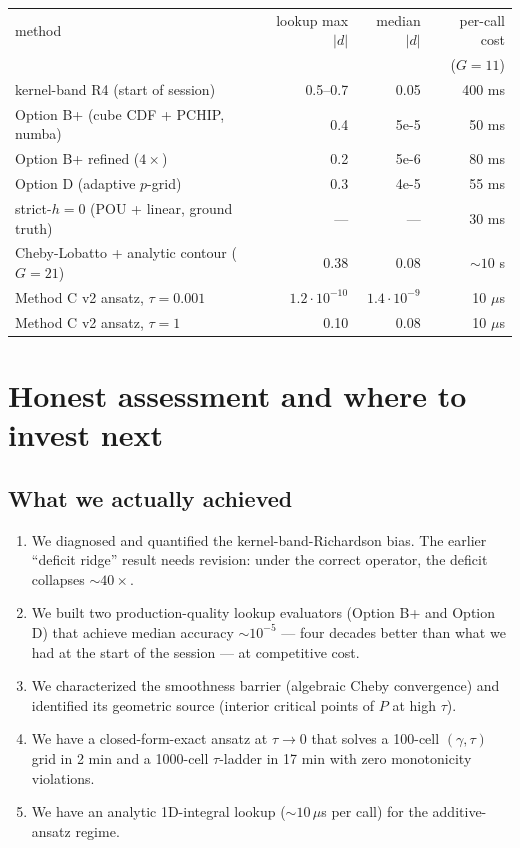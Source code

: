 \documentclass[11pt]{article}
\begin{document}
\begin{center}\begin{tabular}{lrrr}\toprule
method & lookup max$|d|$ & median$|d|$ & per-call cost \\
       &                 &              & ($G{=}11$) \\
\midrule
kernel-band R4 (start of session) & 0.5--0.7 & 0.05 & 400 ms \\
Option B+ (cube CDF + PCHIP, numba) & 0.4 & 5e-5 & 50 ms \\
Option B+ refined ($4{\times}$) & 0.2 & 5e-6 & 80 ms \\
Option D (adaptive $p$-grid) & 0.3 & 4e-5 & 55 ms \\
strict-$h{=}0$ (POU + linear, ground truth) & --- & --- & 30 ms \\
Cheby-Lobatto + analytic contour ($G{=}21$) & 0.38 & 0.08 & $\sim 10$ s \\
Method C v2 ansatz, $\tau{=}0.001$ & $1.2 \cdot 10^{-10}$ & $1.4 \cdot 10^{-9}$ & 10 $\mu$s \\
Method C v2 ansatz, $\tau{=}1$ & 0.10 & 0.08 & 10 $\mu$s \\
\bottomrule\end{tabular}\end{center}

\section{Honest assessment and where to invest next}

\subsection{What we actually achieved}

\begin{enumerate}\itemsep1pt
  \item We diagnosed and quantified the kernel-band-Richardson bias.
        The earlier ``deficit ridge'' result needs revision: under the
        correct operator, the deficit collapses $\sim 40{\times}$.
  \item We built two production-quality lookup evaluators (Option B+
        and Option D) that achieve median accuracy $\sim 10^{-5}$
        --- four decades better than what we had at the start of the
        session --- at competitive cost.
  \item We characterized the smoothness barrier (algebraic Cheby
        convergence) and identified its geometric source (interior
        critical points of $P$ at high $\tau$).
  \item We have a closed-form-exact ansatz at $\tau \to 0$ that
        solves a 100-cell $(\gamma, \tau)$ grid in 2 min and a
        1000-cell $\tau$-ladder in 17 min with zero monotonicity
        violations.
  \item We have an analytic 1D-integral lookup ($\sim 10\,\mu$s per call)
        for the additive-ansatz regime.
\end{enumerate}
\end{document}
